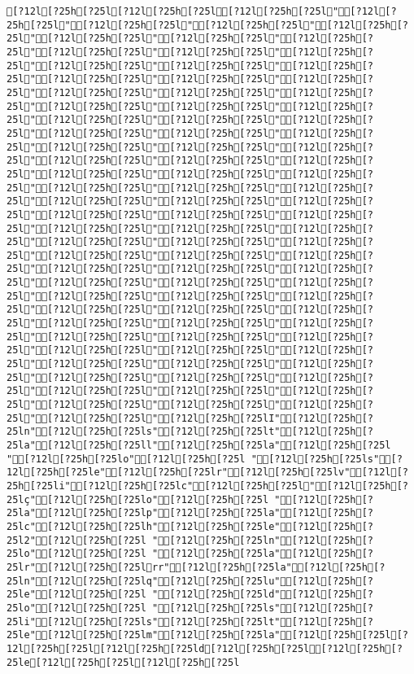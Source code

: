 \documentclass{scrartcl}
\begin{document}
\begin{Verbatim}
[?12l[?25h[?25l[?12l[?25h[?25l[?12l[?25h[?25l"[?12l[?25h[?25l"[?12l[?25h[?25l"[?12l[?25h[?25l"[?12l[?25h[?25l"[?12l[?25h[?25l"[?12l[?25h[?25l"[?12l[?25h[?25l"[?12l[?25h[?25l"[?12l[?25h[?25l"[?12l[?25h[?25l"[?12l[?25h[?25l"[?12l[?25h[?25l"[?12l[?25h[?25l"[?12l[?25h[?25l"[?12l[?25h[?25l"[?12l[?25h[?25l"[?12l[?25h[?25l"[?12l[?25h[?25l"[?12l[?25h[?25l"[?12l[?25h[?25l"[?12l[?25h[?25l"[?12l[?25h[?25l"[?12l[?25h[?25l"[?12l[?25h[?25l"[?12l[?25h[?25l"[?12l[?25h[?25l"[?12l[?25h[?25l"[?12l[?25h[?25l"[?12l[?25h[?25l"[?12l[?25h[?25l"[?12l[?25h[?25l"[?12l[?25h[?25l"[?12l[?25h[?25l"[?12l[?25h[?25l"[?12l[?25h[?25l"[?12l[?25h[?25l"[?12l[?25h[?25l"[?12l[?25h[?25l"[?12l[?25h[?25l"[?12l[?25h[?25l"[?12l[?25h[?25l"[?12l[?25h[?25l"[?12l[?25h[?25l"[?12l[?25h[?25l"[?12l[?25h[?25l"[?12l[?25h[?25l"[?12l[?25h[?25l"[?12l[?25h[?25l"[?12l[?25h[?25l"[?12l[?25h[?25l"[?12l[?25h[?25l"[?12l[?25h[?25l"[?12l[?25h[?25l"[?12l[?25h[?25l"[?12l[?25h[?25l"[?12l[?25h[?25l"[?12l[?25h[?25l"[?12l[?25h[?25l"[?12l[?25h[?25l"[?12l[?25h[?25l"[?12l[?25h[?25l"[?12l[?25h[?25l"[?12l[?25h[?25l"[?12l[?25h[?25l"[?12l[?25h[?25l"[?12l[?25h[?25l"[?12l[?25h[?25l"[?12l[?25h[?25l"[?12l[?25h[?25l"[?12l[?25h[?25l"[?12l[?25h[?25l"[?12l[?25h[?25l"[?12l[?25h[?25l"[?12l[?25h[?25l"[?12l[?25h[?25l"[?12l[?25h[?25l"[?12l[?25h[?25l"[?12l[?25h[?25l"[?12l[?25h[?25l"[?12l[?25h[?25l"[?12l[?25h[?25l"[?12l[?25h[?25l"[?12l[?25h[?25l"[?12l[?25h[?25l"[?12l[?25h[?25l"[?12l[?25h[?25l"[?12l[?25h[?25l"[?12l[?25h[?25l"[?12l[?25h[?25l"[?12l[?25h[?25lI"[?12l[?25h[?25ln"[?12l[?25h[?25ls"[?12l[?25h[?25lt"[?12l[?25h[?25la"[?12l[?25h[?25ll"[?12l[?25h[?25la"[?12l[?25h[?25l "[?12l[?25h[?25lo"[?12l[?25h[?25l "[?12l[?25h[?25ls"[?12l[?25h[?25le"[?12l[?25h[?25lr"[?12l[?25h[?25lv"[?12l[?25h[?25li"[?12l[?25h[?25lc"[?12l[?25h[?25l"[?12l[?25h[?25lç"[?12l[?25h[?25lo"[?12l[?25h[?25l "[?12l[?25h[?25la"[?12l[?25h[?25lp"[?12l[?25h[?25la"[?12l[?25h[?25lc"[?12l[?25h[?25lh"[?12l[?25h[?25le"[?12l[?25h[?25l2"[?12l[?25h[?25l "[?12l[?25h[?25ln"[?12l[?25h[?25lo"[?12l[?25h[?25l "[?12l[?25h[?25la"[?12l[?25h[?25lr"[?12l[?25h[?25lrr"[?12l[?25h[?25la"[?12l[?25h[?25ln"[?12l[?25h[?25lq"[?12l[?25h[?25lu"[?12l[?25h[?25le"[?12l[?25h[?25l "[?12l[?25h[?25ld"[?12l[?25h[?25lo"[?12l[?25h[?25l "[?12l[?25h[?25ls"[?12l[?25h[?25li"[?12l[?25h[?25ls"[?12l[?25h[?25lt"[?12l[?25h[?25le"[?12l[?25h[?25lm"[?12l[?25h[?25la"[?12l[?25h[?25l[?12l[?25h[?25l[?12l[?25h[?25ld[?12l[?25h[?25l[?12l[?25h[?25le[?12l[?25h[?25l[?12l[?25h[?25l

\end{Verbatim}
\end{document}
